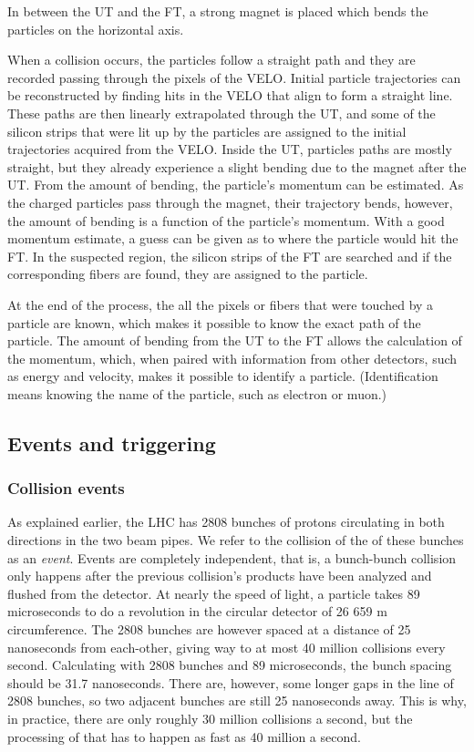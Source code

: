 \documentclass[12pt]{article}
\begin{document}
In between the UT and the FT, a strong magnet is placed which bends the particles on the horizontal axis.

When a collision occurs, the particles follow a straight path and they are recorded passing through the pixels of the VELO. Initial particle trajectories can be reconstructed by finding hits in the VELO that align to form a straight line. These paths are then linearly extrapolated through the UT, and some of the silicon strips that were lit up by the particles are assigned to the initial trajectories acquired from the VELO. Inside the UT, particles paths are mostly straight, but they already experience a slight bending due to the magnet after the UT. From the amount of bending, the particle's momentum can be estimated. As the charged particles pass through the magnet, their trajectory bends, however, the amount of bending is a function of the particle's momentum. With a good momentum estimate, a guess can be given as to where the particle would hit the FT. In the suspected region, the silicon strips of the FT are searched and if the corresponding fibers are found, they are assigned to the particle.

At the end of the process, the all the pixels or fibers that were touched by a particle are known, which makes it possible to know the exact path of the particle. The amount of bending from the UT to the FT allows the calculation of the momentum, which, when paired with information from other detectors, such as energy and velocity, makes it possible to identify a particle. (Identification means knowing the name of the particle, such as electron or muon.)

\subsection{Events and triggering}\label{sec_events_trigger}

\subsubsection{Collision events}\label{sec_event_what}

As explained earlier, the LHC has 2808 bunches of protons circulating in both directions in the two beam pipes. We refer to the collision of the of these bunches as an \textit{event}. Events are completely independent, that is, a bunch-bunch collision only happens after the previous collision's products have been analyzed and flushed from the detector. At nearly the speed of light, a particle takes 89 microseconds to do a revolution in the circular detector of 26 659 m circumference. The 2808 bunches are however spaced at a distance of 25 nanoseconds from each-other, giving way to at most 40 million collisions every second. Calculating with 2808 bunches and 89 microseconds, the bunch spacing should be 31.7 nanoseconds. There are, however, some longer gaps in the line of 2808 bunches, so two adjacent bunches are still 25 nanoseconds away. This is why, in practice, there are only roughly 30 million collisions a second, but the processing of that has to happen as fast as 40 million a second.
\end{document}

